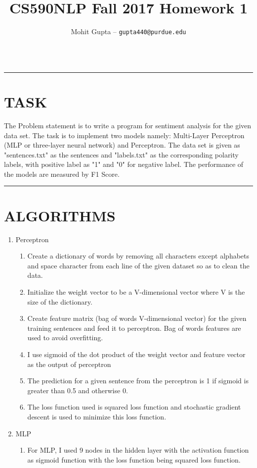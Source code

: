 \documentclass[12pt]{article}
\date{}
\title{CS590NLP Fall 2017 Homework 1 }
\author{Mohit Gupta -- \texttt{gupta440@purdue.edu}}
\begin{document}
  \maketitle
  \begin{center}

  \vspace{-0.3in}
  \begin{tabular}{rl}
  \end{tabular}
  \end{center}

  \noindent
  \rule{\linewidth}{0.4pt}
  
  \section*{TASK}

  The Problem statement is to write a program for sentiment analysis for the given data set. The task is to implement two models namely: Multi-Layer Perceptron (MLP or three-layer neural network) and Perceptron. The data set is given as "sentences.txt" as the sentences and "labels.txt" as the corresponding polarity labels, with positive label as "1" and "0" for negative label. The performance of the models are measured by F1 Score.
  
  \noindent
  	\rule{\linewidth}{0.4pt}
  	
    \section*{ALGORITHMS}
  \begin{enumerate}[label=(\alph*)]
    \item Perceptron
    \begin{enumerate}[]
    \item Create a dictionary of words by removing all characters except alphabets and space character from each line of the given dataset so as to clean the data.
    \item Initialize the weight vector to be a V-dimensional vector where V is the size of the dictionary.
    \item Create feature matrix (bag of words V-dimensional vector) for the given training sentences and feed it to perceptron. Bag of words features are used to avoid overfitting.
    \item I use sigmoid of the dot product of the weight vector and feature vector as the output of perceptron
    \item The prediction for a given sentence from the perceptron is 1 if sigmoid is greater than 0.5 and otherwise 0.
    \item The loss function used is squared loss function and stochastic gradient descent is used to minimize this loss function.
    \end{enumerate}
   \item MLP
  \begin{enumerate}
  \item For MLP, I used 9 nodes in the hidden layer with the activation function as sigmoid function with the loss function being squared loss function.
  \end{enumerate}
  \end{enumerate}
  
\end{document}
